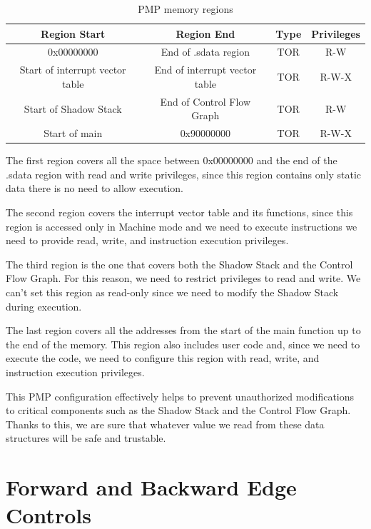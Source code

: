 \begin{table}
  \centering
  \begin{tabular}{|c|c|c|c|}
    \hline
    \textbf{Region Start}           & \textbf{Region End}           & \textbf{Type} & \textbf{Privileges} \\
    \hline
    0x00000000                      & End of .sdata region          & TOR           & R-W                 \\
    \hline
    Start of interrupt vector table & End of interrupt vector table & TOR           & R-W-X               \\
    \hline
    Start of Shadow Stack           & End of Control Flow Graph     & TOR           & R-W                 \\
    \hline
    Start of main                   & 0x90000000                    & TOR           & R-W-X               \\
    \hline
  \end{tabular}
  \caption{PMP memory regions}
  \label{tab:pmpregions}
\end{table}

The first region covers all the space between 0x00000000 and the end of the .sdata
region with read and write privileges, since this region contains only static data
there is no need to allow execution.

The second region covers the interrupt vector table and its functions, since
this region is accessed only in Machine mode and we need to execute instructions
we need to provide read, write, and instruction execution privileges.

The third region is the one that covers both the Shadow Stack and the Control
Flow Graph. For this reason, we need to restrict privileges to read and write. We
can't set this region as read-only since we need to modify the Shadow Stack during
execution.

The last region covers all the addresses from the start of the main function up to
the end of the memory. This region also includes user code and, since we need to
execute the code, we need to configure this region with read, write, and
instruction execution privileges.

This PMP configuration effectively helps to prevent unauthorized modifications
to critical components such as the Shadow Stack and the Control Flow Graph. Thanks
to this, we are sure that whatever value we read from these data structures will
be safe and trustable.

\section{Forward and Backward Edge Controls}
\label{sec:project_controls}


